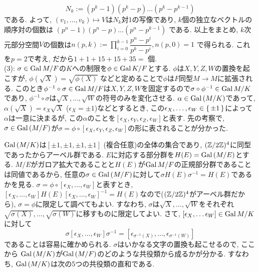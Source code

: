 \begin{egans}
{\[N_k:=(p^k-1)(p^k-p)\dots (p^k-p^{k-1})\]
である. よって, $(v_1,\dots, v_k)\mapsto V$は$N_k$対1の写像であり, $k$個の独立なベクトルの順序対の個数は
$(p^n-1)(p^n-p)\dots (p^n-p^{k-1})$
である. 以上をまとめ, $k$次元部分空間$V$の個数は$n(p,k) := \prod_{i=0}^{k-1} \dfrac{p^n - p^{i}}{p^k - p^i}, n(p,0) = 1$
で得られる. これを$p=2$で考え,
だから$1+1+15+15+35 =$ 個.\\
(3): $\sigma\in \operatorname{Gal}{M/F}$の$K$への制限を$\phi\in \operatorname{Gal}{K/F}$とする. $\phi$は$X,Y,Z,W$の置換を起こすが, $\phi(\sqrt{X}) = \sqrt{\phi(X)}$ などと定めることで$\phi$は$F$同型$M\to M$に拡張される.
このとき$\phi^{-1}\circ \sigma\in \operatorname{Gal}{M/F}$は$X,Y,Z,W$を固定するので$\sigma\circ\phi^{-1}\in \operatorname{Gal}{M/K}$であり, $\phi^{-1}\circ \sigma$は$\sqrt{X},\dots, \sqrt{W}$の符号のみを変化させる. $\alpha\in \operatorname{Gal}{(M/K)}$であって, $\alpha(\sqrt{X}) = \epsilon_{X}\sqrt{X}$ ($\epsilon_X = \pm 1$)などとするとき, この$\epsilon_X,\dots, \epsilon_W\in \set{\pm 1}$によって$\alpha$は一意に決まるが,  この$\alpha$のことを$[\epsilon_X,\epsilon_Y,\epsilon_Z,\epsilon_W]$と表す. 先の考察で, $\sigma\in \operatorname{Gal}{(M/F)}$が$\sigma = \phi\circ [\epsilon_X,\epsilon_Y,\epsilon_Z,\epsilon_W]$の形に表されることが分かった. \par
$\operatorname{Gal}{(M/K)}$は$[\pm1, \pm1 , \pm1, \pm1]$ (複合任意)の全体の集合であり, $(\mathbb{Z}/2\mathbb{Z})^4$に同型であったからアーベル群である.  $E$に対応する部分群を$H(E)=\operatorname{Gal}{(M/E)}$とする. $M/E$がガロア拡大であることと$H(E)$が$\operatorname{Gal}{M/F}$の正規部分群であることは同値であるから, 任意の$\sigma\in \operatorname{Gal}{(M/F)}$に対して$\sigma H(E) \sigma^{-1} = H(E)$であるかを見る. $\sigma = \phi\circ [\epsilon_X,\dots, \epsilon_W]$と表すとき, $[\epsilon_X,\dots, \epsilon_W]H(E)[\epsilon_X,\dots,\epsilon_W]^{-1} = H(E)$なので($(\mathbb{Z}/2\mathbb{Z})^4$がアーベル群だから), $\sigma=\phi$に限定して調べてもよい. すなわち, $\sigma$は$\sqrt{X},\dots, \sqrt{W}$をそれぞれ$\sqrt{\sigma(X)},\dots, \sqrt{\sigma(W)}$に移すものに限定してよい. さて, $[\epsilon_X,\dots \epsilon_W]\in \operatorname{Gal}{M/K}$に対して
\[\sigma[\epsilon_X,\dots, \epsilon_W]\sigma^{-1} = [\epsilon_{\sigma^{-1}(X)},\dots, \epsilon_{\sigma^{-1}(W)}]\]
であることは容易に確かめられる. $\sigma$はいかなる文字の置換も起こせるので, ここから $\operatorname{Gal}{(M/K)}$が$\operatorname{Gal}{(M/F)}$のどのような共役類から成るかが分かる. すなわち, $\operatorname{Gal}{(M/K)}$は次の5つの共役類の直和である.
}
\end{egans}
